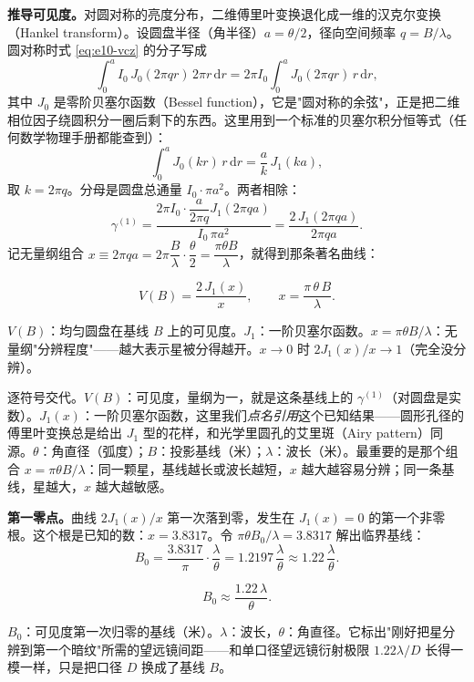 \textbf{推导可见度。}对圆对称的亮度分布，二维傅里叶变换退化成一维的汉克尔变换（Hankel transform）。设圆盘半径（角半径）\(a=\theta/2\)，径向空间频率 \(q=B/\lambda\)。圆对称时式 \eqref{eq:e10-vcz} 的分子写成
\[
  \int_0^{a} I_0\,J_0(2\pi q r)\,2\pi r\,\mathrm dr
  =2\pi I_0\int_0^{a}J_0(2\pi q r)\,r\,\mathrm dr,
\]
其中 \(J_0\) 是零阶贝塞尔函数（Bessel function），它是"圆对称的余弦"，正是把二维相位因子绕圆积分一圈后剩下的东西。这里用到一个标准的贝塞尔积分恒等式（任何数学物理手册都能查到）：
\[
  \int_0^{a} J_0(k r)\,r\,\mathrm dr=\frac{a}{k}\,J_1(k a),
\]
取 \(k=2\pi q\)。分母是圆盘总通量 \(I_0\cdot\pi a^2\)。两者相除：
\[
  \gamma^{(1)}
  =\frac{2\pi I_0\cdot\dfrac{a}{2\pi q}J_1(2\pi q a)}{I_0\,\pi a^2}
  =\frac{2\,J_1(2\pi q a)}{2\pi q a}.
\]
记无量纲组合 \(x\equiv 2\pi q a=2\pi\dfrac{B}{\lambda}\cdot\dfrac{\theta}{2}=\dfrac{\pi\theta B}{\lambda}\)，就得到那条著名曲线：

\begin{equation}
  V(B)=\frac{2\,J_1(x)}{x},\qquad x=\frac{\pi\,\theta\,B}{\lambda}.
  \label{eq:e10-disk}
\end{equation}
\begin{formulaexplain}
\(V(B)\)：均匀圆盘在基线 \(B\) 上的可见度。\(J_1\)：一阶贝塞尔函数。\(x=\pi\theta B/\lambda\)：无量纲"分辨程度"——越大表示星被分得越开。\(x\to0\) 时 \(2J_1(x)/x\to1\)（完全没分辨）。
\end{formulaexplain}

逐符号交代。\(V(B)\)：可见度，量纲为一，就是这条基线上的 \(\gamma^{(1)}\)（对圆盘是实数）。\(J_1(x)\)：一阶贝塞尔函数，这里我们\emph{点名引用}这个已知结果——圆形孔径的傅里叶变换总是给出 \(J_1\) 型的花样，和光学里圆孔的艾里斑（Airy pattern）同源。\(\theta\)：角直径（弧度）；\(B\)：投影基线（米）；\(\lambda\)：波长（米）。最重要的是那个组合 \(x=\pi\theta B/\lambda\)：同一颗星，基线越长或波长越短，\(x\) 越大越容易分辨；同一条基线，星越大，\(x\) 越大越敏感。

\textbf{第一零点。}曲线 \(2J_1(x)/x\) 第一次落到零，发生在 \(J_1(x)=0\) 的第一个非零根。这个根是已知的数：\(x=3.8317\)。令 \(\pi\theta B_0/\lambda=3.8317\) 解出临界基线：
\[
  B_0=\frac{3.8317}{\pi}\cdot\frac{\lambda}{\theta}=1.2197\,\frac{\lambda}{\theta}\approx1.22\,\frac{\lambda}{\theta}.
\]

\begin{equation}
  B_0\approx\frac{1.22\,\lambda}{\theta}.
  \label{eq:e10-null}
\end{equation}
\begin{formulaexplain}
\(B_0\)：可见度第一次归零的基线（米）。\(\lambda\)：波长，\(\theta\)：角直径。它标出"刚好把星分辨到第一个暗纹"所需的望远镜间距——和单口径望远镜衍射极限 \(1.22\lambda/D\) 长得一模一样，只是把口径 \(D\) 换成了基线 \(B\)。
\end{formulaexplain}


